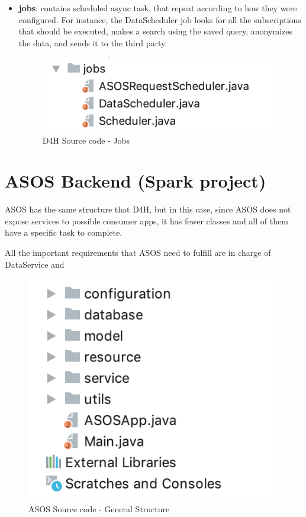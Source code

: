 \documentclass[a4paper, hidelinks, 12pt]{report}
\begin{document}
\begin{itemize}
		\item \textbf{jobs}: contains scheduled async task, that repeat according to how they were configured. For instance, the DataScheduler job looks for all the subscriptions that should be executed, makes a search using the saved query, anonymizes the data, and sends it to the third party.

	\begin{figure}[H]
		\centering
		\includegraphics[scale=0.6]{images/backend/d4h_source_code_jobs.png}
		\caption[D4H Source code - Jobs]{D4H Source code - Jobs}
		\label{fig:d4h_source_code_jobs}
	\end{figure}
	\end{itemize}

\section{ASOS Backend (Spark project)}
ASOS has the same structure that D4H, but in this case, since ASOS does not expose services to possible consumer apps, it has fewer classes and all of them have a specific task to complete.

All the important requirements that ASOS need to fulfill are in charge of DataService and

	\begin{figure}[H]
		\centering
		\includegraphics[scale=0.6]{images/backend/asos_source_code_structure.png}
		\caption[ASOS Source code - General Structure]{ASOS Source code - General Structure}
		\label{fig:asos_source_code_structure}
	\end{figure}
\end{document}
